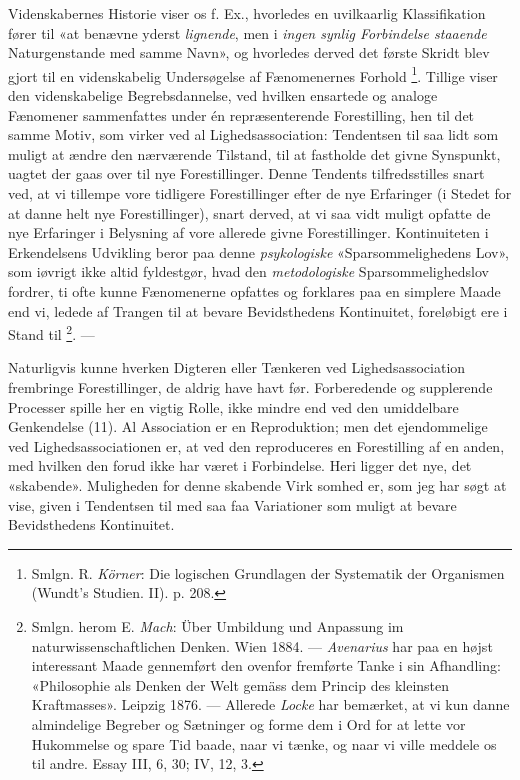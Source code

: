 \documentclass[12pt,a4paper,openany]{book}
\newcommand{\opage}[1]{\marginnote{\footnotesize\textit{[#1]}}}
\begin{document}
Videnskabernes Historie viser os f. Ex., hvorledes en uvilkaarlig
Klassifikation fører til «at benævne yderst \emph{lignende}, men i \emph{ingen
synlig Forbindelse staaende} Naturgenstande med samme Navn», og hvorledes
derved det første Skridt blev gjort til en videnskabelig Undersøgelse af
Fænomenernes Forhold%
\footnote[1]{Smlgn. R. \emph{Körner}: Die logischen Grundlagen der Systematik
der Organismen (Wundt's Studien. II). p. 208.}. Tillige viser den
videnskabelige Begrebsdannelse, ved hvilken ensartede og analoge Fænomener
sammenfattes under én repræsenterende Forestilling, hen til det samme Motiv,
som virker ved al Lighedsassociation: Tendentsen til saa lidt som muligt at
ændre den nærværende Tilstand, til at fastholde det givne Synspunkt, uagtet der
gaas over til nye Forestillinger. Denne Tendents tilfredsstilles snart ved, at
vi tillempe vore tidligere Forestillinger efter de nye Erfaringer (i Stedet for
at danne helt nye Forestillinger), snart derved, at vi saa vidt muligt opfatte
de nye Erfaringer i Belysning af vore allerede givne Forestillinger.
Kontinuiteten i Erkendelsens Udvikling beror paa denne \emph{psykologiske}
«Sparsommelighedens Lov», som iøvrigt ikke altid fyldestgør, hvad den
\emph{metodologiske} Sparsommelighedslov fordrer, ti ofte kunne Fænomenerne
opfattes og forklares paa en simplere Maade end vi, ledede af Trangen til at
bevare Bevidsthedens Kontinuitet, foreløbigt ere i Stand til%
\footnote[2]{Smlgn. herom E. \emph{Mach}: Über Umbildung und Anpassung im
naturwissenschaftlichen Denken. Wien 1884. --- \emph{Avenarius} har paa en
højst interessant Maade gennemført den ovenfor fremførte Tanke i sin
Afhandling: «Philosophie als Denken der Welt gemäss dem Princip des kleinsten
Kraftmasses». Leipzig 1876. --- Allerede \emph{Locke} har bemærket, at vi kun
danne almindelige Begreber og Sætninger og forme dem i Ord for at lette vor
Hukommelse og spare Tid baade, naar vi tænke, og naar vi ville meddele os til
andre. Essay III, 6, 30; IV, 12, 3.}. ---

Naturligvis kunne hverken Digteren eller Tænkeren ved Lighedsassociation
frembringe Forestillinger, de aldrig have havt før. Forberedende og supplerende
Processer spille her en vigtig Rolle, ikke mindre end ved den umiddelbare
Genkendelse (11). Al Association er en Reproduktion; men det ejendommelige ved
Lighedsassociationen er, at ved den reproduceres en Forestilling af en anden,
med hvilken den forud ikke har været i Forbindelse. Heri ligger det nye, det
«skabende». Muligheden for denne skabende Virk%
\setcounter{footnote}{0}%
\opage{57}somhed er, som jeg har søgt at vise, given i Tendentsen til med saa
faa Variationer som muligt at bevare Bevidsthedens Kontinuitet.
\end{document}
